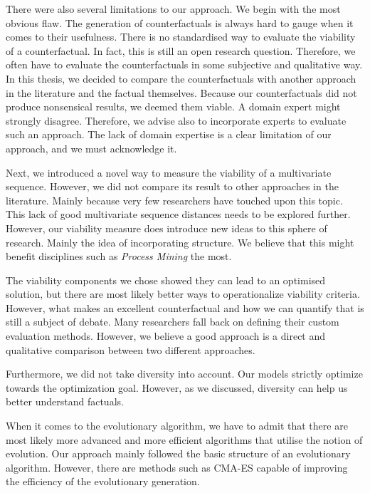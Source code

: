 \documentclass[./../../paper.tex]{subfiles}
\begin{document}
There were also several limitations to our approach. We begin with the most obvious flaw. The generation of counterfactuals is always hard to gauge when it comes to their usefulness. There is no standardised way to evaluate the viability of a counterfactual. In fact, this is still an open research question\cite{hsieh_DiCE4ELInterpretingProcess_2021,mothilal_ExplainingMachineLearning_2020}. Therefore, we often have to evaluate the counterfactuals in some subjective and qualitative way. In this thesis, we decided to compare the counterfactuals with another approach in the literature and the factual themselves. Because our counterfactuals did not produce nonsensical results, we deemed them viable. A domain expert might strongly disagree. Therefore, we advise also to incorporate experts to evaluate such an approach. The lack of domain expertise is a clear limitation of our approach, and we must acknowledge it. 

Next, we introduced a novel way to measure the viability of a multivariate sequence. However, we did not compare its result to other approaches in the literature. Mainly because very few researchers have touched upon this topic. This lack of good multivariate sequence distances needs to be explored further. However, our viability measure does introduce new ideas to this sphere of research. Mainly the idea of incorporating structure. We believe that this might benefit disciplines such as \emph{Process Mining} the most. 

The viability components we chose showed they can lead to an optimised solution, but there are most likely better ways to operationalize viability criteria. However, what makes an excellent counterfactual and how we can quantify that is still a subject of debate. Many researchers fall back on defining their custom evaluation methods. However, we believe a good approach is a direct and qualitative comparison between two different approaches.

Furthermore, we did not take diversity into account. Our models strictly optimize towards the optimization goal. However, as we discussed, diversity can help us better understand factuals.

When it comes to the evolutionary algorithm, we have to admit that there are most likely more advanced and more efficient algorithms that utilise the notion of evolution. Our approach mainly followed the basic structure of an evolutionary algorithm. However, there are methods such as CMA-ES capable of improving the efficiency of the evolutionary generation. 
\end{document}
